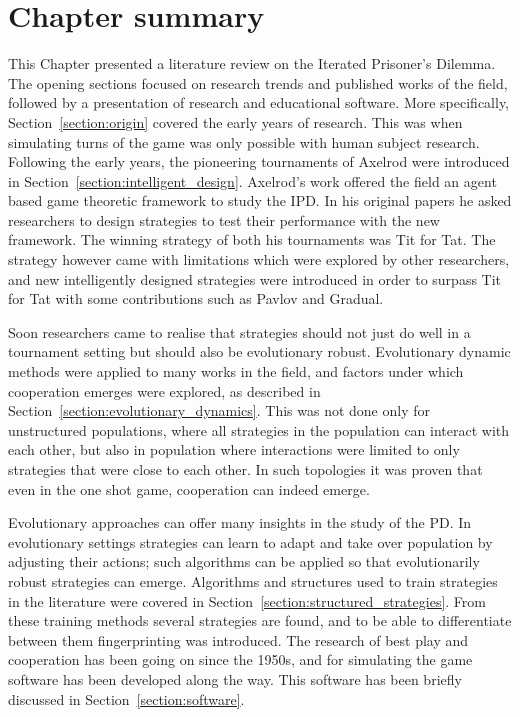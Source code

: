 \section{Chapter summary}

This Chapter presented a literature review on the Iterated Prisoner's
Dilemma. The opening sections focused on research trends and published works of
the field, followed by a presentation of research and educational software.
More specifically, Section~\ref{section:origin}
covered the early years of research. This was when simulating turns of the game
was only possible with human subject research.
Following the early years, the pioneering tournaments of Axelrod were introduced in
Section~\ref{section:intelligent_design}. Axelrod's work offered the field an
agent based game theoretic framework to study the IPD.
In his original papers he asked researchers to design strategies to test their
performance with the new framework. The winning strategy of both his tournaments
was Tit for Tat. The strategy however came with limitations which were explored
by other researchers, and new intelligently designed strategies were introduced in
order to surpass Tit for Tat with some contributions such as Pavlov and Gradual.

Soon researchers came to realise that strategies should not just do well in a tournament setting
but should also be evolutionary robust. Evolutionary dynamic methods were
applied to many works in the field, and factors under which cooperation
emerges were explored, as described in Section~\ref{section:evolutionary_dynamics}.
This was not done only for unstructured populations, where all strategies
in the population can interact with each other, but also in population where
interactions were limited to only strategies that were close to each other.
In such topologies it was proven that even in the one shot game, cooperation can
indeed emerge.

Evolutionary approaches can offer many insights in the study of the PD. In
evolutionary settings strategies can learn to adapt and take over population by
adjusting their actions; such algorithms can be applied so that evolutionarily
robust strategies can emerge. Algorithms and structures used to train strategies
in the literature were covered in Section~\ref{section:structured_strategies}.
From these training methods several strategies are found,
and to be able to differentiate between them fingerprinting was
introduced. The research of best play and cooperation has been going on since
the 1950s, and for simulating the game software has been developed along the
way. This software has been briefly discussed
in Section~\ref{section:software}.

